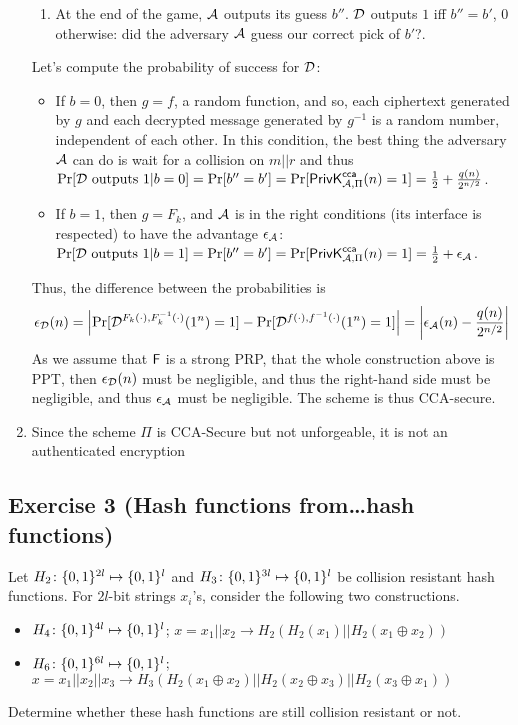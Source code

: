 \begin{solution}
\begin{enumerate}
\begin{enumerate}
			\item At the end of the game, $\mathcal{A}$ outputs its guess $b''$. $\mathcal{D}$ outputs $1$ iff $b''=b'$, $0$ otherwise: did the adversary $\mathcal{A}$ guess our correct pick of $b'$?.
		\end{enumerate}
		Let's compute the probability of success for $\mathcal{D}$:
		\begin{itemize}
			\item If $b=0$, then $g=f$, a random function, and so, each ciphertext generated by $g$ and each decrypted message generated by $g^{-1}$ is a random number, independent of each other. In this condition, the best thing the adversary $\mathcal{A}$ can do is wait for a collision on $m||r$ and thus $\Pr[\mathcal{D} \text{ outputs } 1 | b=0]=\Pr[b''=b']=\Pr[\mathsf{PrivK}_{\mathcal{A},\Pi}^\mathsf{cca}(n)=1]=\frac12 + \frac{q(n)}{2^{n/2}}$.
			\item If $b=1$, then $g=F_k$, and $\mathcal{A}$ is in the right conditions (its interface is respected) to have the advantage $\epsilon_{\mathcal{A}}$: $\Pr[\mathcal{D} \text{ outputs } 1 | b=1]=\Pr[b''=b']=\Pr[\mathsf{PrivK}_{\mathcal{A},\Pi}^\mathsf{cca}(n)=1]=\frac12 + \epsilon_{\mathcal{A}}$.
		\end{itemize}
		Thus, the difference between the probabilities is
		\[ \epsilon_{\mathcal{D}}(n) = {\left\lvert \Pr[\mathcal{D}^{F_k(\cdot), F^{-1}_k(\cdot)}(1^n)=1] - \Pr[\mathcal{D}^{f(\cdot), f^{-1}(\cdot)}(1^n)=1] \right\lvert} = {\left\lvert \epsilon_{\mathcal{A}}(n) - \frac{q(n)}{2^{n/2}} \right\lvert} \]
		As we assume that $\operatorname{\mathsf{F}}$ is a strong PRP, that the whole construction above is PPT, then $\epsilon_{\mathcal{D}}(n)$ must be negligible, and thus the right-hand side must be negligible, and thus $\epsilon_{\mathcal{A}}$ must be negligible. The scheme is thus CCA-secure.

		\item Since the scheme $\Pi$ is CCA-Secure but not unforgeable, it is not an authenticated encryption
	\end{enumerate}
\end{solution}



\subsection{Exercise 3 (Hash functions from\ldots hash functions)}

Let $H_2\colon\{0, 1\}^{2l}\mapsto\{0, 1\}^{l}$ and $H_3\colon\{0, 1\}^{3l}\mapsto\{0, 1\}^{l}$ be
collision resistant hash functions. For $2l$-bit strings $x_i$'s, consider the following two constructions.
\begin{itemize}
	\item $H_4\colon\{0, 1\}^{4l}\mapsto\{0, 1\}^{l}$;
	$x=x_1||x_2\rightarrow H_2\left(H_2(x_1)||H_2(x_1\oplus x_2)\right)$
	\smallskip
	\item $H_6\colon\{0, 1\}^{6l}\mapsto\{0, 1\}^{l}$;
	$x=x_1||x_2||x_3\rightarrow H_3\left(H_2(x_1\oplus x_2)||H_2(x_2\oplus x_3)||H_2(x_3\oplus x_1)\right)$
\end{itemize}
Determine whether these hash functions are still collision resistant or not.


